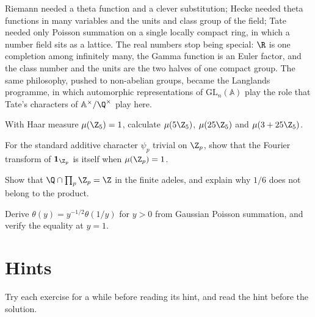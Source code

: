 \begin{beauty}
Riemann needed a theta function and a clever substitution; Hecke needed theta functions in many variables and the units and class group of the field;
Tate needed only Poisson summation on a single locally compact ring, in which a number field sits as a lattice. The real numbers stop being special:
$\R$ is one completion among infinitely many, the Gamma function is an Euler factor, and the class number and the units are the two halves of one compact
group. The same philosophy, pushed to non-abelian groups, became the Langlands programme, in which automorphic representations of $\mathrm{GL}_n(\mathbb{A})$
play the role that Tate's characters of $\mathbb{A}^\times/\Q^\times$ play here.
\end{beauty}

\begin{exercise}[$\star$]\label{ex:v13-extra-12-1}
With Haar measure $\mu(\Z_5)=1$, calculate $\mu(5\Z_5)$, $\mu(25\Z_5)$ and $\mu(3+25\Z_5)$.
\end{exercise}

\begin{exercise}[$\star$]\label{ex:v13-extra-12-2}
For the standard additive character $\psi_p$ trivial on $\Z_p$, show that the Fourier transform of $\mathbf1_{\Z_p}$ is itself when $\mu(\Z_p)=1$.
\end{exercise}

\begin{exercise}[$\star\star$]\label{ex:v13-extra-12-3}
Show that $\Q\cap\prod_p\Z_p=\Z$ in the finite adeles, and explain why $1/6$ does not belong to the product.
\end{exercise}

\begin{exercise}[$\star\star\star$]\label{ex:v13-extra-12-4}
Derive $\theta(y)=y^{-1/2}\theta(1/y)$ for $y>0$ from Gaussian Poisson summation, and verify the equality at $y=1$.
\end{exercise}

\section{Hints}

Try each exercise for a while before reading its hint, and read the hint before the solution.

